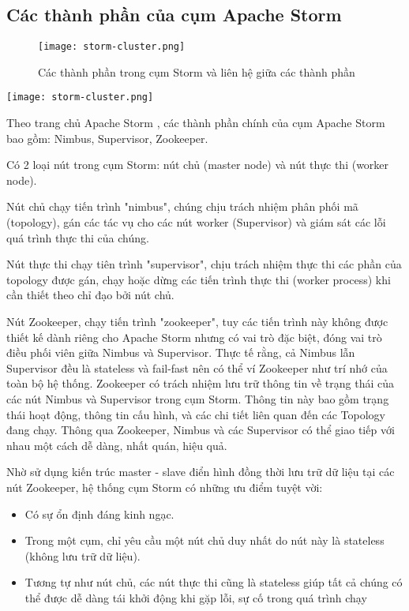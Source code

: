 \subsection{Các thành phần của cụm Apache Storm}

\begin{figure}[htbp]
    \begin{center}
        \texttt{[image: storm-cluster.png]}
        \caption{Các thành phần trong cụm Storm và liên hệ giữa các thành phần}
    \end{center}
\end{figure}
\texttt{[image: storm-cluster.png]}

Theo trang chủ Apache Storm \autocite{apachestorm}, các thành phần chính của cụm Apache Storm bao gồm: Nimbus, Supervisor, Zookeeper.

Có 2 loại nút trong cụm Storm: nút chủ (master node) và nút thực thi (worker node).

Nút chủ chạy tiến trình "nimbus", chúng chịu trách nhiệm phân phối mã (topology), gán các tác vụ cho các nút worker (Supervisor) và giám sát các lỗi quá trình thực thi của chúng.

Nút thực thi chạy tiên trình "supervisor", chịu trách nhiệm thực thi các phần của topology được gán, chạy hoặc dừng các tiến trình thực thi (worker process) khi cần thiết theo chỉ đạo bởi nút chủ.

Nút Zookeeper, chạy tiến trình "zookeeper", tuy các tiến trình này không được thiết kế dành riêng cho Apache Storm nhưng có vai trò đặc biệt, đóng vai trò điều phối viên giữa Nimbus và Supervisor. Thực tế rằng, cả Nimbus lẫn Supervisor đều là stateless và fail-fast nên có thể ví Zookeeper như trí nhớ của toàn bộ hệ thống. Zookeeper có trách nhiệm lưu trữ thông tin về trạng thái của các nút Nimbus và Supervisor trong cụm Storm. Thông tin này bao gồm trạng thái hoạt động, thông tin cấu hình, và các chi tiết liên quan đến các Topology đang chạy. Thông qua Zookeeper, Nimbus và các Supervisor có thể giao tiếp với nhau một cách dễ dàng, nhất quán, hiệu quả.

Nhờ sử dụng kiến trúc master - slave điển hình đồng thời lưu trữ dữ liệu tại các nút Zookeeper, hệ thống cụm Storm có những ưu điểm tuyệt vời:

\begin{itemize}
    \item Có sự ổn định đáng kinh ngạc.
    \item Trong một cụm, chỉ yêu cầu một nút chủ duy nhất do nút này là stateless (không lưu trữ dữ liệu).
    \item Tương tự như nút chủ, các nút thực thi cũng là stateless giúp tất cả chúng có thể được dễ dàng tái khởi động khi gặp lỗi, sự cố trong quá trình chạy
\end{itemize}

